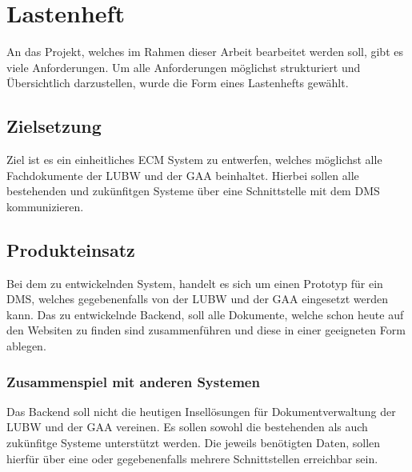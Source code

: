 \section{Lastenheft} \label{Lastenheft}
An das Projekt, welches im Rahmen dieser Arbeit bearbeitet werden soll, gibt es viele Anforderungen. Um alle Anforderungen m\"oglichst strukturiert und \"Ubersichtlich darzustellen, wurde die Form eines Lastenhefts gew\"ahlt.

\subsection{Zielsetzung} \label{Zielsetzung}
Ziel ist es ein einheitliches \ac{ECM} System zu entwerfen, welches m\"oglichst alle Fachdokumente der \ac{LUBW} und der \ac{GAA} beinhaltet.
Hierbei sollen alle bestehenden und zuk\"unfitgen Systeme \"uber eine Schnittstelle mit dem \ac{DMS} kommunizieren.

\subsection{Produkteinsatz} \label{Produkteinsatz}
Bei dem zu entwickelnden System, handelt es sich um einen Prototyp f\"ur ein \ac{DMS}, welches gegebenenfalls von der \ac{LUBW} und der \ac{GAA} eingesetzt werden kann. Das zu entwickelnde Backend, soll alle Dokumente, welche schon heute auf den Websiten zu finden sind zusammenf\"uhren und diese in einer geeigneten Form ablegen.

\subsubsection{Zusammenspiel mit anderen Systemen} \label{Zusammenspiel mit anderen Systemen}
Das Backend soll nicht die heutigen Insell\"osungen f\"ur Dokumentverwaltung der \ac{LUBW} und der \ac{GAA} vereinen. Es sollen sowohl die bestehenden als auch zuk\"unfitge Systeme unterst\"utzt werden. Die jeweils ben\"otigten Daten, sollen hierf\"ur \"uber eine oder gegebenenfalls mehrere Schnittstellen erreichbar sein.

